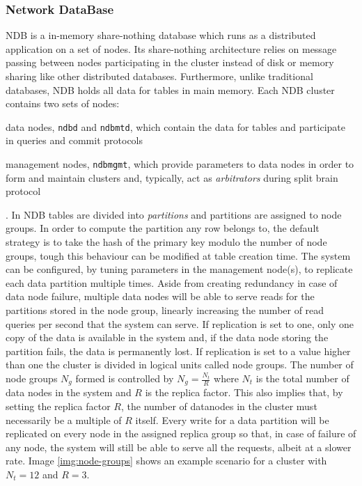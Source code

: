 \subsubsection{Network DataBase}
NDB is a in-memory share-nothing database which runs as a distributed application on a set of nodes.
Its share-nothing architecture relies on message passing between nodes participating in the cluster instead of disk or memory sharing like other distributed databases.
Furthermore, unlike traditional databases, NDB holds all data for tables in main memory.
Each NDB cluster contains two sets of nodes: \begin{inparaenum}[i)]
    \item data nodes, \texttt{ndbd} and \texttt{ndbmtd}, which contain the data for tables and participate in queries and commit protocols
    \item management nodes, \texttt{ndbmgmt}, which provide parameters to data nodes in order to form and maintain clusters and, typically, act as \emph{arbitrators} during split brain protocol 
\end{inparaenum}.
In NDB tables are divided into \emph{partitions} and partitions are assigned to node groups.
In order to compute the partition any row belongs to, the default strategy is to take the hash of the primary key modulo the number of node groups, tough this behaviour can be modified at table creation time.
The system can be configured, by tuning parameters in the management node(s), to replicate each data partition multiple times.
Aside from creating redundancy in case of data node failure, multiple data nodes will be able to serve reads for the partitions stored in the node group, linearly increasing the number of read queries per second that the system can serve.
If replication is set to one, only one copy of the data is available in the system and, if the data node storing the partition fails, the data is permanently lost.
If replication is set to a value higher than one the cluster is divided in logical units called node groups.
The number of node groups $N_g$ formed is controlled by $N_g = \frac{N_t}{R}$ where $N_t$ is the total number of data nodes in the system and $R$ is the replica factor.
This also implies that, by setting the replica factor $R$, the number of datanodes in the cluster must necessarily be a multiple of $R$ itself.
Every write for a data partition will be replicated on every node in the assigned replica group so that, in case of failure of any node, the system will still be able to serve all the requests, albeit at a slower rate.
Image \ref{img:node-groups} shows an example scenario for a cluster with $N_t = 12$ and $R = 3$.

